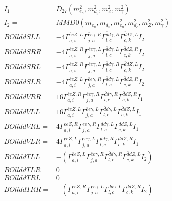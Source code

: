 \documentclass[A4,landscape]{article}
\begin{document}
\begin{align} 
I_1 = & D_{27}(m^2_{e_{{a}}}, m^2_{d_{{c}}}, m^2_{Z}, m^2_{\gamma}) \\ 
I_2 = & MMD0(m_{e_{{a}}}, m_{d_{{c}}}, m^2_{e_{{a}}}, m^2_{d_{{c}}}, m^2_{Z}, m^2_{\gamma}) \\ 
  BOllddSLL= & -4  \Gamma^{\bar{e}e Z ,L}_{a, i} \Gamma^{\bar{e}e \gamma ,R}_{j, a} \Gamma^{\bar{d}d \gamma ,R}_{l, c} \Gamma^{\bar{d}d Z ,L}_{c, k} I_2 \\ 
  BOllddSRR= & -4  \Gamma^{\bar{e}e Z ,R}_{a, i} \Gamma^{\bar{e}e \gamma ,L}_{j, a} \Gamma^{\bar{d}d \gamma ,L}_{l, c} \Gamma^{\bar{d}d Z ,R}_{c, k} I_2 \\ 
  BOllddSRL= & -4  \Gamma^{\bar{e}e Z ,R}_{a, i} \Gamma^{\bar{e}e \gamma ,L}_{j, a} \Gamma^{\bar{d}d \gamma ,R}_{l, c} \Gamma^{\bar{d}d Z ,L}_{c, k} I_2 \\ 
  BOllddSLR= & -4  \Gamma^{\bar{e}e Z ,L}_{a, i} \Gamma^{\bar{e}e \gamma ,R}_{j, a} \Gamma^{\bar{d}d \gamma ,L}_{l, c} \Gamma^{\bar{d}d Z ,R}_{c, k} I_2 \\ 
  BOllddVRR= & 16  \Gamma^{\bar{e}e Z ,R}_{a, i} \Gamma^{\bar{e}e \gamma ,R}_{j, a} \Gamma^{\bar{d}d \gamma ,R}_{l, c} \Gamma^{\bar{d}d Z ,R}_{c, k} I_1 \\ 
  BOllddVLL= & 16  \Gamma^{\bar{e}e Z ,L}_{a, i} \Gamma^{\bar{e}e \gamma ,L}_{j, a} \Gamma^{\bar{d}d \gamma ,L}_{l, c} \Gamma^{\bar{d}d Z ,L}_{c, k} I_1 \\ 
  BOllddVRL= & 4  \Gamma^{\bar{e}e Z ,R}_{a, i} \Gamma^{\bar{e}e \gamma ,R}_{j, a} \Gamma^{\bar{d}d \gamma ,L}_{l, c} \Gamma^{\bar{d}d Z ,L}_{c, k} I_1 \\ 
  BOllddVLR= & 4  \Gamma^{\bar{e}e Z ,L}_{a, i} \Gamma^{\bar{e}e \gamma ,L}_{j, a} \Gamma^{\bar{d}d \gamma ,R}_{l, c} \Gamma^{\bar{d}d Z ,R}_{c, k} I_1 \\ 
  BOllddTLL= & -( \Gamma^{\bar{e}e Z ,L}_{a, i} \Gamma^{\bar{e}e \gamma ,R}_{j, a} \Gamma^{\bar{d}d \gamma ,R}_{l, c} \Gamma^{\bar{d}d Z ,L}_{c, k} I_2) \\ 
  BOllddTLR= & 0 \\ 
  BOllddTRL= & 0 \\ 
  BOllddTRR= & -( \Gamma^{\bar{e}e Z ,R}_{a, i} \Gamma^{\bar{e}e \gamma ,L}_{j, a} \Gamma^{\bar{d}d \gamma ,L}_{l, c} \Gamma^{\bar{d}d Z ,R}_{c, k} I_2) \\ 
\end{align} 
\end{document}
